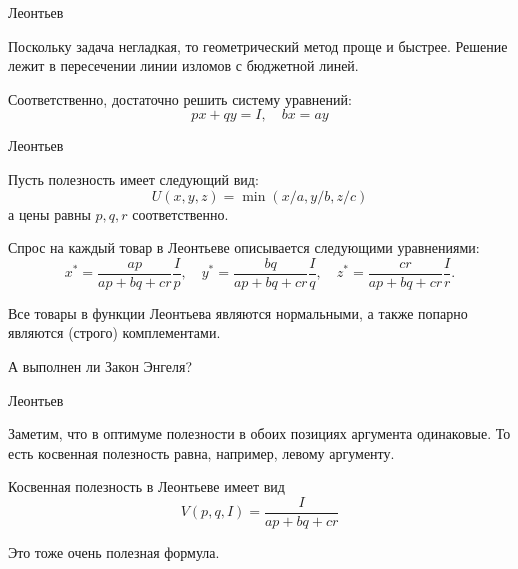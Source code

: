 \documentclass{beamer}
\begin{document}
\begin{frame}{Леонтьев}

Поскольку задача негладкая, то геометрический метод проще и быстрее. Решение лежит в пересечении линии изломов с бюджетной линей. 

Соответственно, достаточно решить систему уравнений:
$$ px + qy = I, \quad b x = a y$$

\end{frame}

\begin{frame}{Леонтьев}

Пусть полезность имеет следующий вид:
$$U(x,y,z) = \min(x/a, y/b, z/c)$$ 
а цены равны $p, q, r$ соответственно. 

Спрос на каждый товар в Леонтьеве описывается следующими уравнениями:
$$
x^{\ast} = \frac{ap}{ap + bq + cr} \frac{I}{p}, \quad
y^{\ast} = \frac{bq}{ap + bq + cr} \frac{I}{q}, \quad
z^{\ast} = \frac{cr}{ap + bq + cr} \frac{I}{r}.
$$

Все товары в функции Леонтьева являются нормальными, а также попарно являются (строго) комплементами. 

А выполнен ли Закон Энгеля?

\end{frame}

\begin{frame}{Леонтьев}

Заметим, что в оптимуме полезности в обоих позициях аргумента одинаковые. То есть косвенная полезность равна, например, левому аргументу.


Косвенная полезность в Леонтьеве имеет вид
$$V(p,q,I) = \frac{I}{ap + bq + cr}$$

Это тоже очень полезная формула.

\end{frame}
\end{document}
